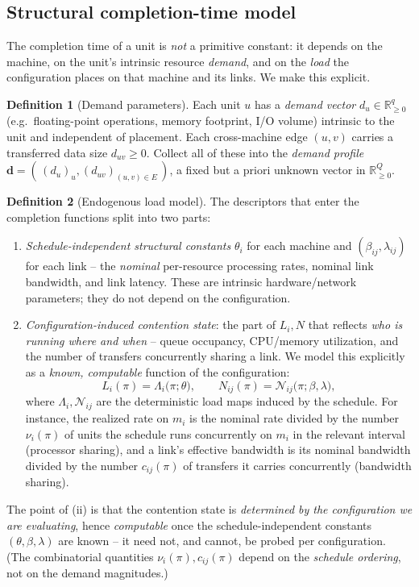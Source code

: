 \documentclass{amsart}
\theoremstyle{definition}
\newtheorem{definition}{Definition}
\begin{document}
\subsection{Structural completion-time model}

The completion time of a unit is \emph{not} a primitive constant: it depends on
the machine, on the unit's intrinsic resource \emph{demand}, and on the
\emph{load} the configuration places on that machine and its links. We make
this explicit.

\begin{definition}[Demand parameters]\label{def:demand}
Each unit $u$ has a \emph{demand vector} $d_u\in\mathbb{R}^{q}_{\ge0}$
(e.g.\ floating-point operations, memory footprint, I/O volume) intrinsic to the
unit and independent of placement. Each cross-machine edge $(u,v)$ carries a
transferred data size $d_{uv}\ge0$. Collect all of these into the
\emph{demand profile} $\mathbf d=(\,(d_u)_{u},(d_{uv})_{(u,v)\in E}\,)$, a fixed
but a priori unknown vector in $\mathbb{R}^Q_{\ge0}$.
\end{definition}

\begin{definition}[Endogenous load model]\label{def:load}
The descriptors that enter the completion functions split into two parts:
\begin{enumerate}
\item[(i)] \emph{Schedule-independent structural constants} $\theta_i$ for each
machine and $(\beta_{ij},\lambda_{ij})$ for each link -- the \emph{nominal}
per-resource processing rates, nominal link bandwidth, and link latency. These
are intrinsic hardware/network parameters; they do not depend on the
configuration.
\item[(ii)] \emph{Configuration-induced contention state}: the part of $L_i,N$
that reflects \emph{who is running where and when} -- queue occupancy,
CPU/memory utilization, and the number of transfers concurrently sharing a
link. We model this explicitly as a \emph{known, computable} function of the
configuration:
\[
L_i(\pi)=\Lambda_i\big(\pi;\theta\big),\qquad
N_{ij}(\pi)=\mathcal N_{ij}\big(\pi;\beta,\lambda\big),
\]
where $\Lambda_i,\mathcal N_{ij}$ are the deterministic load maps induced by
the schedule. For instance, the realized rate on $m_i$ is the nominal rate
divided by the number $\nu_i(\pi)$ of units the schedule runs concurrently on
$m_i$ in the relevant interval (processor sharing), and a link's effective
bandwidth is its nominal bandwidth divided by the number $c_{ij}(\pi)$ of
transfers it carries concurrently (bandwidth sharing).
\end{enumerate}
The point of (ii) is that the contention state is \emph{determined by the
configuration we are evaluating}, hence \emph{computable} once the
schedule-independent constants $(\theta,\beta,\lambda)$ are known -- it need
not, and cannot, be probed per configuration. (The combinatorial quantities
$\nu_i(\pi),c_{ij}(\pi)$ depend on the \emph{schedule ordering}, not on the
demand magnitudes.)
\end{definition}
\end{document}
